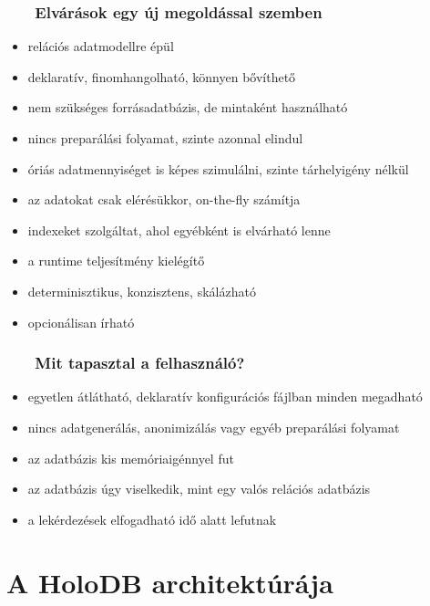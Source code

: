 \documentclass[
]{beamer}
\newcommand{\slidetitle}[2]{\frametitle{{\small #1 ~ \ding{226} ~ } \normalsize \textbf{#2} }}
\begin{document}
\begin{frame}
    \slidetitle{\sectionshorttitle}{Elvárások egy új megoldással szemben}
    
    \begin{itemize}
        \setlength\itemsep{0.5em}
        \pause \item relációs adatmodellre épül
        \pause \item deklaratív, finomhangolható, könnyen bővíthető
        \pause \item nem szükséges forrásadatbázis, de mintaként használható
        \pause \item nincs preparálási folyamat, szinte azonnal elindul
        \pause \item óriás adatmennyiséget is képes szimulálni, szinte tárhelyigény nélkül
        \pause \item az adatokat csak elérésükkor, on-the-fly számítja
        \pause \item indexeket szolgáltat, ahol egyébként is elvárható lenne
        \pause \item a runtime teljesítmény kielégítő
        \pause \item determinisztikus, konzisztens, skálázható
        \pause \item opcionálisan írható
    \end{itemize}
\end{frame}

\begin{frame}
    \slidetitle{\sectionshorttitle}{Mit tapasztal a felhasználó?}
    
    \begin{itemize}
        \setlength\itemsep{1em}
        \item egyetlen átlátható, deklaratív konfigurációs fájlban minden megadható \pause
        \item nincs adatgenerálás, anonimizálás vagy egyéb preparálási folyamat \pause
        \item az adatbázis kis memóriaigénnyel fut \pause
        \item az adatbázis úgy viselkedik, mint egy valós relációs adatbázis \pause
        \item a lekérdezések elfogadható idő alatt lefutnak
    \end{itemize}
\end{frame}

\section{A HoloDB architektúrája}
\def\sectionshorttitle{Architektúra}
\end{document}
